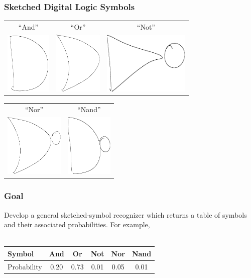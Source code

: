 \documentclass{beamer}
\begin{document}
\begin{frame}
\frametitle{Sketched Digital Logic Symbols}
\begin{center}
\begin{tabular}{ccc}
``And''&``Or''&``Not''\\
\includegraphics[height=3cm]{and.png}&\includegraphics[height=3cm]{or.png}&\includegraphics[height=3cm]{not.png}
\end{tabular}
\begin{tabular}{cc}
``Nor''&``Nand''\\
\includegraphics[height=3cm]{nor.png}&\includegraphics[height=3cm]{nand.png}
\end{tabular}
\end{center}
\end{frame}

\begin{frame}
\frametitle{Goal}
Develop a general sketched-symbol recognizer which returns a table of symbols and their associated probabilities.
For example, \\ \\
\begin{center}
\begin{tabular}{|l|ccccc|}
\hline
Symbol&And&Or&Not&Nor&Nand\\
\hline
Probability&0.20&0.73&0.01&0.05&0.01\\
\hline
\end{tabular}
\end{center}
\end{frame}
\end{document}
